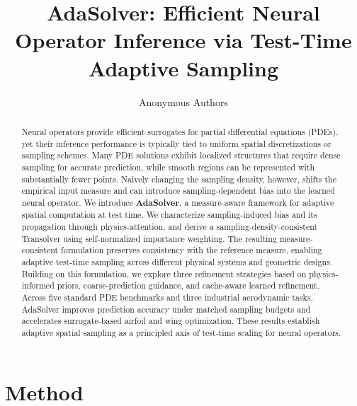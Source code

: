 \documentclass{article}
\title{AdaSolver: Efficient Neural Operator Inference via Test-Time Adaptive Sampling}
\author{Anonymous Authors}
\begin{document}
\maketitle

\begin{abstract}
Neural operators provide efficient surrogates for partial differential equations (PDEs), yet their inference performance is typically tied to uniform spatial discretizations or sampling schemes. Many PDE solutions exhibit localized structures that require dense sampling for accurate prediction, while smooth regions can be represented with substantially fewer points. Naively changing the sampling density, however, shifts the empirical input measure and can introduce sampling-dependent bias into the learned neural operator. We introduce \textbf{AdaSolver}, a measure-aware framework for adaptive spatial computation at test time. We characterize sampling-induced bias and its propagation through physics-attention, and derive a sampling-density-consistent Transolver using self-normalized importance weighting. The resulting measure-consistent formulation  preserves consistency with the reference measure, enabling adaptive test-time sampling across different physical systems and geometric designs. Building on this formulation, we explore three refinement strategies based on physics-informed priors, coarse-prediction guidance, and cache-aware learned refinement. Across five standard PDE benchmarks and three industrial aerodynamic tasks, AdaSolver improves prediction accuracy under matched sampling budgets and accelerates surrogate-based airfoil and wing optimization. These results establish adaptive spatial sampling as a principled axis of test-time scaling for neural operators.
\end{abstract}




\vspace{-2em}
\section{Method}









\FloatBarrier


\clearpage



\appendix

\clearpage

\clearpage

\clearpage

\FloatBarrier
\clearpage


\clearpage


\end{document}
